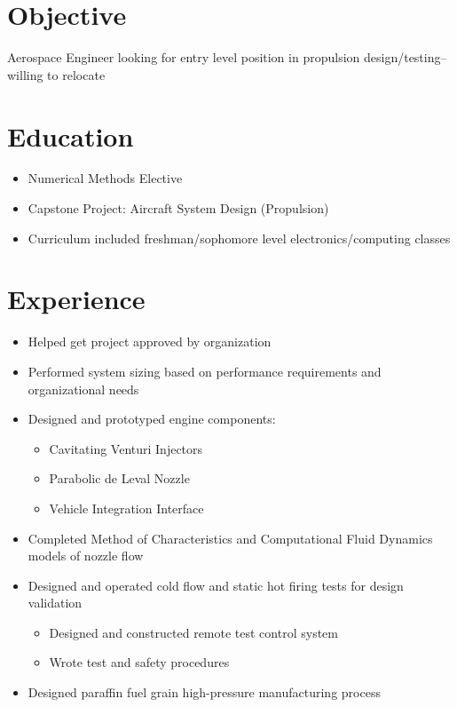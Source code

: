 \documentclass[11pt]{moderncv}
\begin{document}
\makecvtitle

\section{Objective}
Aerospace Engineer looking for entry level position in propulsion design/testing--willing to relocate
\section{Education}
\begin{itemize}
\item Numerical Methods Elective
\item Capstone Project: Aircraft System Design (Propulsion)
\item Curriculum included freshman/sophomore level electronics/computing classes
\end{itemize}
\section{Experience}
\begin{itemize}
\item Helped get project approved by organization
\item Performed system sizing based on performance requirements and organizational needs
\item Designed and prototyped engine components:
      \begin{itemize}
      \item Cavitating Venturi Injectors
      \item Parabolic de Leval Nozzle
      \item Vehicle Integration Interface
      \end{itemize}
\item Completed Method of Characteristics and Computational Fluid Dynamics models of nozzle flow
\item Designed and operated cold flow and static hot firing tests for design validation
      \begin{itemize}
      \item Designed and constructed remote test control system
      \item Wrote test and safety procedures
      \end{itemize}
\item Designed paraffin fuel grain high-pressure manufacturing process
\end{itemize}
\end{document}

